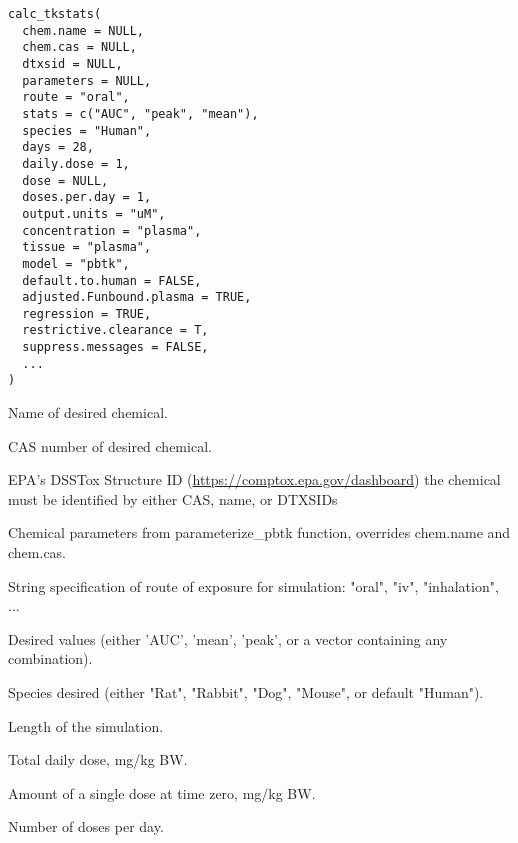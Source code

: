 \documentclass[a4paper]{book}
\begin{document}
%
\begin{Usage}
\begin{verbatim}
calc_tkstats(
  chem.name = NULL,
  chem.cas = NULL,
  dtxsid = NULL,
  parameters = NULL,
  route = "oral",
  stats = c("AUC", "peak", "mean"),
  species = "Human",
  days = 28,
  daily.dose = 1,
  dose = NULL,
  doses.per.day = 1,
  output.units = "uM",
  concentration = "plasma",
  tissue = "plasma",
  model = "pbtk",
  default.to.human = FALSE,
  adjusted.Funbound.plasma = TRUE,
  regression = TRUE,
  restrictive.clearance = T,
  suppress.messages = FALSE,
  ...
)
\end{verbatim}
\end{Usage}
%
\begin{Arguments}
\begin{ldescription}
\item[\code{chem.name}] Name of desired chemical.

\item[\code{chem.cas}] CAS number of desired chemical.

\item[\code{dtxsid}] EPA's DSSTox Structure ID (\url{https://comptox.epa.gov/dashboard})
the chemical must be identified by either CAS, name, or DTXSIDs

\item[\code{parameters}] Chemical parameters from parameterize\_pbtk function,
overrides chem.name and chem.cas.

\item[\code{route}] String specification of route of exposure for simulation:
"oral", "iv", "inhalation", ...

\item[\code{stats}] Desired values (either 'AUC', 'mean', 'peak', or a vector
containing any combination).

\item[\code{species}] Species desired (either "Rat", "Rabbit", "Dog", "Mouse", or
default "Human").

\item[\code{days}] Length of the simulation.

\item[\code{daily.dose}] Total daily dose, mg/kg BW.

\item[\code{dose}] Amount of a single dose at time zero, mg/kg BW.

\item[\code{doses.per.day}] Number of doses per day.


\end{ldescription}
\end{Arguments}
\end{document}
